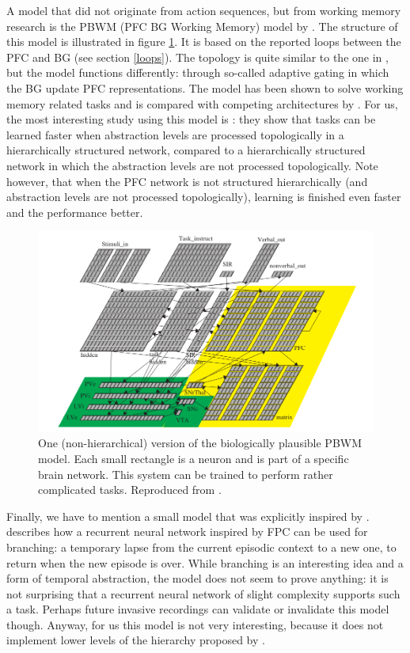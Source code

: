 \documentclass[10pt,a4paper]{report}
\begin{document}
A model that did not originate from action sequences, but from working memory research is the PBWM (PFC BG Working Memory) model by \citet{Frank2001}. The structure of this model is illustrated in figure \ref{oreilly}. It is based on the reported loops between the PFC and BG (see section \ref{loops}). The topology is quite similar to the one in \citet{Dominey1995}, but the model functions differently: through so-called adaptive gating in which the BG update PFC representations. The model has been shown to solve working memory related tasks and is compared with competing architectures by \citet{O'Reilly2006}. For us, the most interesting study using this model is \citet{Reynolds2009}: they show that tasks can be learned faster when abstraction levels are processed topologically in a hierarchically structured network, compared to a hierarchically structured network in which the abstraction levels are not processed topologically. Note however, that when the PFC network is not structured hierarchically (and abstraction levels are not processed topologically), learning is finished even faster and the performance better.

\begin{figure}[tbhp]
\begin{center}
\includegraphics[width=\textwidth]{figures/oreilly.png}
\caption{One (non-hierarchical) version of the biologically plausible PBWM model. Each small rectangle is a neuron and is part of a specific brain network. This system can be trained to perform rather complicated tasks. Reproduced from \citet{Hazy2007}.}
\label{oreilly}
\end{center}
\end{figure}

Finally, we have to mention a small model that was explicitly inspired by \citet{Koechlin2003}. \citet{Koechlin2007} describes how a recurrent neural network inspired by FPC can be used for branching: a temporary lapse from the current episodic context to a new one, to return when the new episode is over. While branching is an interesting idea and a form of temporal abstraction, the model does not seem to prove anything: it is not surprising that a recurrent neural network of slight complexity supports such a task. Perhaps future invasive recordings can validate or invalidate this model though. Anyway, for us this model is not very interesting, because it does not implement lower levels of the hierarchy proposed by \citet{Koechlin2003}.
\end{document}
